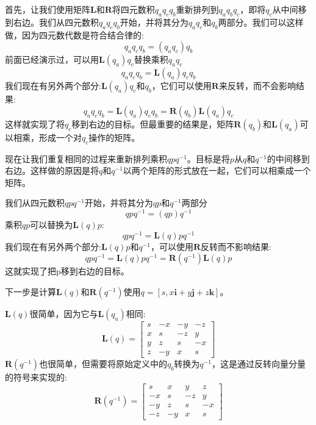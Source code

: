 首先，让我们使用矩阵$\mathbf{L}$和$\mathbf{R}$将四元数积$q_{a} q_{c} q_{b}$重新排列到$q_{a} q_{b} q_{c}$，即将$q_{c}$从中间移到右边。我们从四元数积$q_{a} q_{c} q_{b}$开始，并将其分为$q_{a} q_{c}$和$q_{b}$两部分。我们可以这样做，因为四元数代数是符合结合律的:
$$
q_{a} q_{c} q_{b}=\left(q_{a} q_{c}\right) q_{b}
$$
前面已经演示过，可以用$\mathbf{L}\left(q_{a}\right) q_{c}$替换乘积$q_{a} q_{c}$
$$
q_{a} q_{c} q_{b}=\mathbf{L}\left(q_{a}\right) q_{c} q_{b}
$$
我们现在有另外两个部分:$\mathbf{L}\left(q_{a}\right) q_{c}$和$q_{b}$，它们可以使用$\mathbf{R}$来反转，而不会影响结果:
$$
q_{a} q_{c} q_{b}=\mathbf{L}\left(q_{a}\right) q_{c} q_{b}=\mathbf{R}\left(q_{b}\right) \mathbf{L}\left(q_{a}\right) q_{c}
$$
这样就实现了将$q_{c}$移到右边的目标。但最重要的结果是，矩阵$\mathbf{R}\left(q_{b}\right)$和$\mathbf{L}\left(q_{a}\right)$可以相乘，形成一个对$q_{c}$操作的矩阵。

现在让我们重复相同的过程来重新排列乘积$q p q^{-1}$。目标是将$p$从$q$和$q^{-1}$的中间移到右边。这样做的原因是将$q$和$q^{-1}$以两个矩阵的形式放在一起，它们可以相乘成一个矩阵。

我们从四元数积$q p q^{-1}$开始，并将其分为$q p$和$q^{-1}$两部分
$$
q p q^{-1}=(q p) q^{-1}
$$
乘积$ qp $可以替换为$\mathbf{L}(q) p$:
$$
q p q^{-1}=\mathbf{L}(q) p q^{-1}
$$
我们现在有另外两个部分:$\mathbf{L}(q) p$和$q^{-1}$，可以使用$\mathbf{R}$反转而不影响结果:
$$
q p q^{-1}=\mathbf{L}(q) p q^{-1}=\mathbf{R}\left(q^{-1}\right) \mathbf{L}(q) p
$$
这就实现了把p移到右边的目标。

下一步是计算$\mathbf{L}(q)$和$\mathbf{R}\left(q^{-1}\right)$使用$q=[s, x \mathbf{i}+y \mathbf{j}+z \mathbf{k}]$。

$\mathbf{L}(q)$很简单，因为它与$\mathbf{L}\left(q_{a}\right)$相同:
$$
\mathbf{L}(q)=\left[\begin{array}{cccc}
s & -x & -y & -z \\
x & s & -z & y \\
y & z & s & -x \\
z & -y & x & s
\end{array}\right]
$$
$\mathbf{R}\left(q^{-1}\right)$也很简单，但需要将原始定义中的$q_{b}$转换为$q^{-1}$，这是通过反转向量分量的符号来实现的:
$$
\mathbf{R}\left(q^{-1}\right)=\left[\begin{array}{cccc}
s & x & y & z \\
-x & s & -z & y \\
-y & z & s & -x \\
-z & -y & x & s
\end{array}\right]
$$


